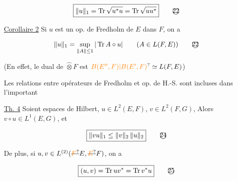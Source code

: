 \[
\boxed{\|u\|_1=\operatorname{Tr}\sqrt{u^*u}=\operatorname{Tr}\sqrt{uu^*}} \tag*{\textcircled{22}}
\]

\uline{Corollaire 2} Si $u$ est un op. de Fredholm de $E$ dans $F$,
on a

\[
\|u\|_1=\sup_{\|A\|\leq1}|\operatorname{Tr} A\circ u|\qquad(A\in L(F,E)) \tag*{\textcircled{22}}
\]

(En effet, le dual de $\widehat\otimes F$ est $\unsure{B(E'',F)|B(E',F)}\simeq L(F,E)$) 


 Les relations entre opérateurs de Fredholm et op.
de H.-S. sont incluses dans l'important

\uline{Th. 4} Soient   espaces de Hilbert, $u\in L^2(E,F)$, $v\in L^2(F,G)$,
Alors $v\circ u\in L^1(E,G)$, et 

\[
\boxed{\|vu\|_1\leq\|v\|_2\,\|u\|_2} \tag*{\textcircled{24}}
\]

De plus, si $u,v\in L^{(2)}(\deleted{\unsure{F}}E,\deleted{\unsure{E}}F)$, on a

\[
\boxed{(u,v)=\operatorname{Tr}uv^*=\operatorname{Tr}v^*u} \tag*{\textcircled{25}}
\]

